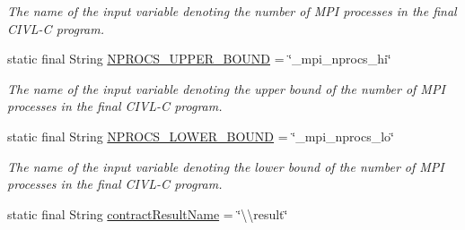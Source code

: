 \begin{DoxyCompactItemize}
\begin{DoxyCompactList}\small\item\em The name of the input variable denoting the number of M\+P\+I processes in the final C\+I\+V\+L-\/\+C program. \end{DoxyCompactList}\item 
\hypertarget{classedu_1_1udel_1_1cis_1_1vsl_1_1civl_1_1model_1_1IF_1_1ModelConfiguration_a3f194efc4c56bf84e063af7cf39025a2}{}static final String \hyperlink{classedu_1_1udel_1_1cis_1_1vsl_1_1civl_1_1model_1_1IF_1_1ModelConfiguration_a3f194efc4c56bf84e063af7cf39025a2}{N\+P\+R\+O\+C\+S\+\_\+\+U\+P\+P\+E\+R\+\_\+\+B\+O\+U\+N\+D} = \char`\"{}\+\_\+mpi\+\_\+nprocs\+\_\+hi\char`\"{}\label{classedu_1_1udel_1_1cis_1_1vsl_1_1civl_1_1model_1_1IF_1_1ModelConfiguration_a3f194efc4c56bf84e063af7cf39025a2}

\begin{DoxyCompactList}\small\item\em The name of the input variable denoting the upper bound of the number of M\+P\+I processes in the final C\+I\+V\+L-\/\+C program. \end{DoxyCompactList}\item 
\hypertarget{classedu_1_1udel_1_1cis_1_1vsl_1_1civl_1_1model_1_1IF_1_1ModelConfiguration_aac0301117c5abdced59a752a573b9864}{}static final String \hyperlink{classedu_1_1udel_1_1cis_1_1vsl_1_1civl_1_1model_1_1IF_1_1ModelConfiguration_aac0301117c5abdced59a752a573b9864}{N\+P\+R\+O\+C\+S\+\_\+\+L\+O\+W\+E\+R\+\_\+\+B\+O\+U\+N\+D} = \char`\"{}\+\_\+mpi\+\_\+nprocs\+\_\+lo\char`\"{}\label{classedu_1_1udel_1_1cis_1_1vsl_1_1civl_1_1model_1_1IF_1_1ModelConfiguration_aac0301117c5abdced59a752a573b9864}

\begin{DoxyCompactList}\small\item\em The name of the input variable denoting the lower bound of the number of M\+P\+I processes in the final C\+I\+V\+L-\/\+C program. \end{DoxyCompactList}\item 
\hypertarget{classedu_1_1udel_1_1cis_1_1vsl_1_1civl_1_1model_1_1IF_1_1ModelConfiguration_a9f25c584dd59257bdc91ca343d7e70e3}{}static final String \hyperlink{classedu_1_1udel_1_1cis_1_1vsl_1_1civl_1_1model_1_1IF_1_1ModelConfiguration_a9f25c584dd59257bdc91ca343d7e70e3}{contract\+Result\+Name} = \char`\"{}\textbackslash{}\textbackslash{}result\char`\"{}\label{classedu_1_1udel_1_1cis_1_1vsl_1_1civl_1_1model_1_1IF_1_1ModelConfiguration_a9f25c584dd59257bdc91ca343d7e70e3}


\end{DoxyCompactItemize}
